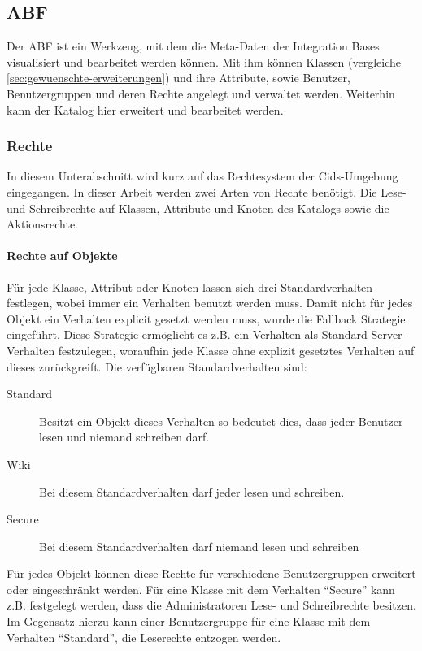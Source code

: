 \subsection{ABF}
Der \ac{ABF} ist ein Werkzeug, mit dem die Meta-Daten der Integration Bases visualisiert und bearbeitet werden können.
Mit ihm können Klassen (vergleiche \autoref{sec:gewuenschte-erweiterungen}) und ihre Attribute, sowie Benutzer, Benutzergruppen und deren Rechte angelegt und verwaltet werden.
Weiterhin kann der Katalog hier erweitert und bearbeitet werden.

\subsubsection{Rechte}
In diesem Unterabschnitt wird kurz auf das Rechtesystem der Cids-Umgebung eingegangen. In dieser Arbeit werden zwei Arten von Rechte benötigt. Die Lese- und Schreibrechte auf Klassen, Attribute und Knoten des Katalogs sowie die Aktionsrechte.

\paragraph{Rechte auf Objekte}
Für jede Klasse, Attribut oder Knoten lassen sich drei Standardverhalten festlegen, wobei immer ein Verhalten benutzt werden muss.
Damit nicht für jedes Objekt ein Verhalten explicit gesetzt werden muss, wurde die Fallback Strategie eingeführt.
Diese Strategie ermöglicht es z.B. ein Verhalten als Standard-Server-Verhalten festzulegen, woraufhin jede Klasse ohne explizit gesetztes Verhalten auf dieses zurückgreift.
Die verfügbaren Standardverhalten sind:
\begin{description}
\item[Standard] Besitzt ein Objekt dieses Verhalten so bedeutet dies, dass jeder Benutzer lesen und niemand schreiben darf.
\item[Wiki] Bei diesem Standardverhalten darf jeder lesen und schreiben.
\item[Secure] Bei diesem Standardverhalten darf niemand lesen und schreiben
\end{description}
Für jedes Objekt können diese Rechte für verschiedene Benutzergruppen erweitert oder eingeschränkt werden.
Für eine Klasse mit dem Verhalten "`Secure"' kann z.B. festgelegt werden, dass die Administratoren Lese- und Schreibrechte besitzen.
Im Gegensatz hierzu kann einer Benutzergruppe für eine Klasse mit dem Verhalten "`Standard"', die Leserechte entzogen werden. \autocite[vgl.][]{cismet-workshop}


